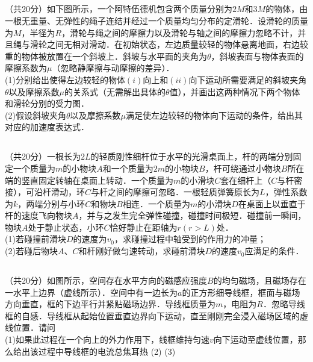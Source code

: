 \subsection{ }
（共20分）如下图所示，一个阿特伍德机包含两个质量分别为$2M$和$3M$的物体，由一根无重量、无弹性的绳子连结并经过一个质量均匀分布的定滑轮．设滑轮的质量为$M$，半径为$R$，滑轮与绳之间的摩擦力以及滑轮与轴之间的摩擦力忽略不计，并且绳与滑轮之间无相对滑动．在初始状态，左边质量较轻的物体悬离地面，右边较重的物体被放置在一个斜坡上．斜坡与水平面的夹角为$\theta$，斜坡表面与物体表面的摩擦系数为$\mu$（忽略静摩擦与动摩擦的差异）．\\
(1)分别给出使得左边较轻的物体$(i)$向上和$(ii)$向下运动所需要满足的斜坡夹角$\theta$以及摩擦系数$\mu$的关系式（无需解出具体的$\theta$值），并画出这两种情况下两个物体和滑轮分别的受力图．\\
(2)假设斜坡夹角$\theta$以及摩擦系数$\mu$满足使左边较轻的物体向下运动的条件，给出其对应的加速度表达式．\\
\subsection{ }
（共20分）一根长为$2L$的轻质刚性细杆位于水平的光滑桌面上，杆的两端分别固定一个质量为$m$的小物块$A$和一个质量为$2m$的小物块$B$，杆可绕通过小物块$B$所在端的竖直固定转轴在桌面上转动．一个质量为$m$的小滑块$C$套在细杆上（$C$与杆密接），可沿杆滑动，环$C$与杆之间的摩擦可忽略．一根轻质弹簧原长为$L$，弹性系数为$k$，两端分别与小环$C$和物块$B$相连．一个质量为$m$的小滑块$D$在桌面上以垂直于杆的速度飞向物块$A$，并与之发生完全弹性碰撞，碰撞时间极短．碰撞前一瞬间，物块$A$处于静止状态，小环$C$恰好静止在距轴为$r(r>L)$处．\\
(1)若碰撞前滑块$D$的速度为$v_{0}$，求碰撞过程中轴受到的作用力的冲量；\\
(2)若碰后物块$A$、$C$和杆刚好做匀速转动，求碰前滑块$D$的速度$v_{0}$应满足的条件．\\
\subsection{ }
（共20分）如图所示，空间存在水平方向的磁感应强度$B$的均匀磁场，且磁场存在一水平上边界（虚线所示）．空间中有一边长为$a$的正方形细导线框，框面与磁场方向垂直，框的下边平行并紧贴磁场边界．导线框质量为$m$，电阻为$R$．忽略导线框的自感．导线框从起始位置垂直边界向下运动，直至刚刚完全浸入磁场区域的虚线位置．请问\\
(1)如果此过程在一个向上的外力作用下，线框维持匀速$v$向下运动至虚线位置，那么给出该过程中导线框的电流总焦耳热
(2)
(3)